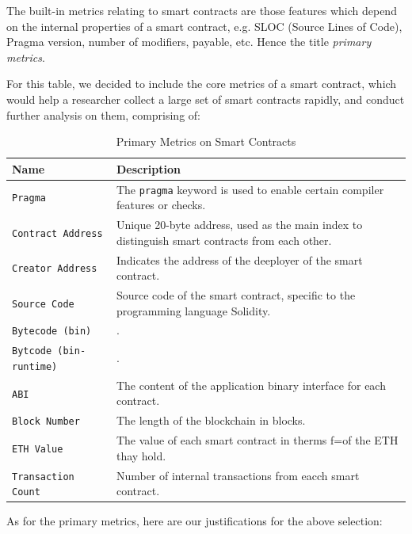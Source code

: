 		The built-in metrics relating to smart contracts are those features which depend on the internal properties of a smart contract, e.g. SLOC (Source Lines of Code), Pragma version, number of modifiers, payable, etc. Hence the title \emph{primary metrics}.

		For this table, we decided to include the core metrics of a smart contract, which would help a researcher collect a large set of smart contracts rapidly, and conduct further analysis on them, comprising of:

		\begin{table}[H]
			\caption{Primary Metrics on Smart Contracts}
			\label{tab:intrinsic-cues}
			\centering
			\begin{adjustbox}{width=1\textwidth}
			\def\arraystretch{1.3}
			\begin{tabular}{l|p{105mm}}
				\textbf{Name} & \textbf{Description} \\
				\hline
				\verb|Pragma| & The \verb|pragma| keyword is used to enable certain compiler features or checks.~\cite{pragmadocs}\\
				\verb|Contract Address| & Unique 20-byte address, used as the main index to distinguish smart contracts from each other. \\
				\verb|Creator Address| & Indicates the address of the deeployer of the smart contract. \\
				\verb|Source Code| & Source code of the smart contract, specific to the programming language Solidity. \\
				\verb|Bytecode (bin)| & . \\
				\verb|Bytcode (bin-runtime)| & . \\
				\verb|ABI| & The content of the application binary interface for each contract. \\
				\verb|Block Number| & The length of the blockchain in blocks. \\
				\verb|ETH Value| & The value of each smart contract in therms f=of the ETH thay hold. \\
				\verb|Transaction Count| & Number of internal transactions from eacch smart contract. \\
			\end{tabular}
			\end{adjustbox}
	\end{table}

	As for the primary metrics, here are our justifications for the above selection:

